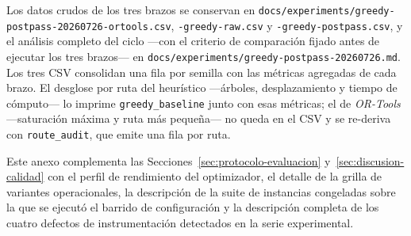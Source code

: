\begin{sloppypar}
Los datos crudos de los tres brazos se conservan en
\texttt{docs/experiments/greedy-postpass-20260726-ortools.csv}, \texttt{-greedy-raw.csv} y
\texttt{-greedy-postpass.csv}, y el análisis completo del ciclo ---con el criterio de comparación
fijado antes de ejecutar los tres brazos--- en \texttt{docs/experiments/greedy-postpass-20260726.md}.
Los tres CSV consolidan una fila por semilla con las métricas agregadas de cada brazo. El desglose
por ruta del heurístico ---árboles, desplazamiento y tiempo de cómputo--- lo imprime
\texttt{greedy\_baseline} junto con esas métricas; el de \textit{OR-Tools} ---saturación máxima y
ruta más pequeña--- no queda en el CSV y se re-deriva con \texttt{route\_audit}, que emite una fila
por ruta.
\end{sloppypar}

\label{anx:grilla-variantes}

Este anexo complementa las Secciones~\ref{sec:protocolo-evaluacion}
y~\ref{sec:discusion-calidad} con el perfil de rendimiento del optimizador, el detalle de la
grilla de variantes operacionales, la descripción de la suite de instancias congeladas sobre la
que se ejecutó el barrido de configuración y la descripción completa de los cuatro defectos de
instrumentación detectados en la serie experimental.

